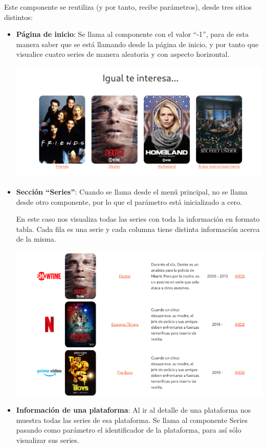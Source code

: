 \documentclass{\ClassPath/viu-tfm-template}
\begin{document}
Este componente se reutiliza (y por tanto, recibe parámetros), desde tres sitios distintos:
\begin{itemize}
    \item \textbf{Página de inicio}: Se llama al componente con el valor “-1”, para de esta manera saber que se está llamando desde la página de inicio, y por tanto que visualice cuatro series de manera aleatoria y con aspecto horizontal.

    \begin{center}
        \includegraphics[frame,width=0.7\linewidth]{img/series-1.png}
    \end{center}

    \item \textbf{Sección “Series”}: Cuando se llama desde el menú principal, no se llama desde otro componente, por lo que el parámetro está inicializado a cero.

    En este caso nos visualiza todas las series con toda la información en formato tabla. Cada fila es una serie y cada columna tiene distinta información acerca de la misma.
    \vspace{-0.2em}
    \begin{center}
        \includegraphics[frame,width=0.7\linewidth]{img/series-2.png}
    \end{center}

    \item \textbf{Información de una plataforma}: Al ir al detalle de una plataforma nos muestra todas las series de esa plataforma. Se llama al componente Series pasando como parámetro el identificador de la plataforma, para así sólo visualizar sus series.


\end{itemize}
\end{document}
